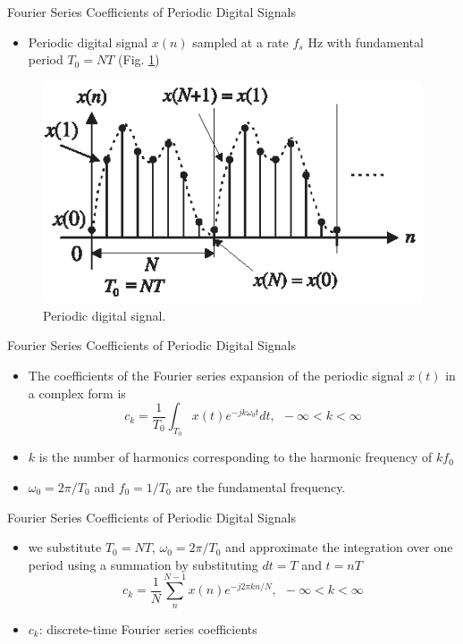 \documentclass[pdflatex,compress,mathserif]{beamer}
\begin{document}
\begin{frame}{Fourier Series Coefficients of Periodic Digital Signals}
    \begin{itemize}
        \item Periodic digital signal $x(n)$ sampled at a rate $f_s$ Hz with fundamental period $T_0 = NT$ (Fig. \ref{fig:04.02})
    \end{itemize}
    \begin{figure}
        \includegraphics[width=0.6\linewidth]{fig/fig.4.02}
        \caption{Periodic digital signal.}
        \label{fig:04.02}
    \end{figure}
\end{frame}

\begin{frame}{Fourier Series Coefficients of Periodic Digital Signals}
    \begin{itemize}
        \item The coefficients of the Fourier series expansion of the periodic signal $x(t)$ in a complex form is
        \begin{equation}
            c_k=\frac{1}{T_0} \int_{T_0}x(t)e^{-jk\omega_0 t} dt,~~-\infty<k<\infty
        \end{equation}
        \item $k$ is the number of harmonics corresponding to the harmonic frequency of $kf_0$
        \item $\omega_0 = 2\pi/T_0$ and $f_0 = 1/T_0$ are the fundamental frequency.
    \end{itemize}
\end{frame}

\begin{frame}{Fourier Series Coefficients of Periodic Digital Signals}
    \begin{itemize}
        \item we substitute $T_0=NT$, $\omega_0=2\pi/T_0$ and approximate the integration over one period using a summation by substituting $dt=T$ and $t=nT$
        \begin{equation}
            c_k=\frac{1}{N} \sum_{n}^{N-1}x(n)e^{-j2\pi k n/N},~~-\infty<k<\infty
        \end{equation}
        \item $c_k$: discrete-time Fourier series coefficients
    \end{itemize}
\end{frame}
\end{document}
